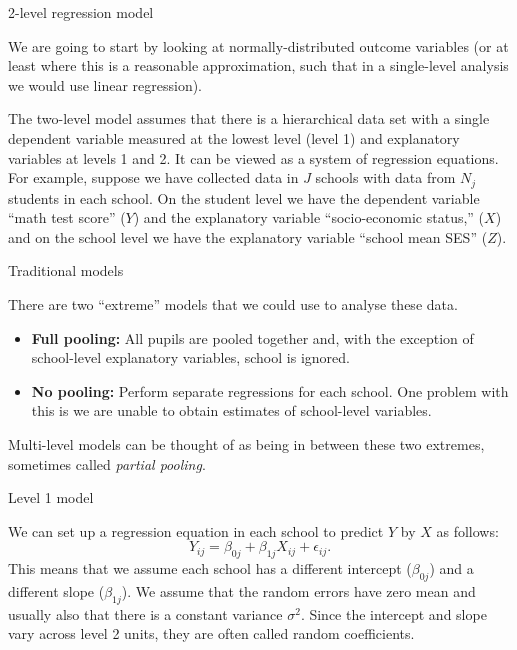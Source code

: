 \documentclass[10pt,ignorenonframetext,]{beamer}
\begin{document}
\begin{frame}{2-level regression model}

We are going to start by looking at normally-distributed outcome
variables (or at least where this is a reasonable approximation, such
that in a single-level analysis we would use linear regression).

The two-level model assumes that there is a hierarchical data set with a
single dependent variable measured at the lowest level (level 1) and
explanatory variables at levels 1 and 2. It can be viewed as a system of
regression equations. For example, suppose we have collected data in
\(J\) schools with data from \(N_j\) students in each school. On the
student level we have the dependent variable ``math test score'' (\(Y\))
and the explanatory variable ``socio-economic status,'' (\(X\)) and on
the school level we have the explanatory variable ``school mean SES''
(\(Z\)).

\end{frame}

\begin{frame}{Traditional models}

There are two ``extreme'' models that we could use to analyse these
data.

\begin{itemize}
\item
  \textbf{Full pooling:} All pupils are pooled together and, with the
  exception of school-level explanatory variables, school is ignored.
\item
  \textbf{No pooling:} Perform separate regressions for each school. One
  problem with this is we are unable to obtain estimates of school-level
  variables.
\end{itemize}

Multi-level models can be thought of as being in between these two
extremes, sometimes called \emph{partial pooling}.

\end{frame}

\begin{frame}{Level 1 model}

We can set up a regression equation in each school to predict \(Y\) by
\(X\) as follows: \[
Y_{ij} = \beta_{0j} + \beta_{1j} X_{ij} + \epsilon_{ij}.
\] This means that we assume each school has a different intercept
(\(\beta_{0j}\)) and a different slope (\(\beta_{1j}\)). We assume that
the random errors have zero mean and usually also that there is a
constant variance \(\sigma^2\). Since the intercept and slope vary
across level 2 units, they are often called random coefficients.

\end{frame}
\end{document}
